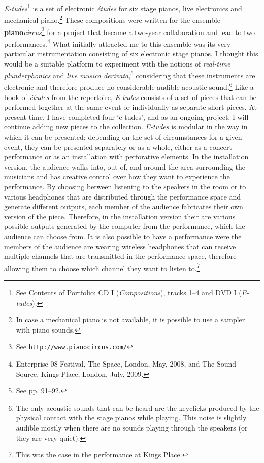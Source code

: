 \emph{E-tudes}\footnote{See \hyperlink{portfolio}{Contents of Portfolio}: CD I (\emph{Compositions}), tracks 1--4 and DVD I (\emph{E-tudes}).} is a set of electronic \emph{\'{e}tudes} for six stage pianos, live electronics and mechanical piano.\footnote{In case a mechanical piano is not available, it is possible to use a sampler with piano sounds.} These compositions were written for the ensemble \textbf{piano}\emph{circus}\footnote{See \href{http://www.pianocircus.com/}{\texttt{http://www.pianocircus.com/}}} for a project that became a \mbox{two-year} collaboration and lead to two performances.\footnote{Enterprise 08 Festival, The Space, London, May, 2008, and The Sound Source, Kings Place, London, July, 2009.} What initially attracted me to this ensemble was its very particular instrumentation consisting of six electronic stage pianos. I thought this would be a suitable platform to experiment with the notions of \emph{real-time plunderphonics} and \emph{live musica derivata},\footnote{See \hyperlink{realtimeplunderfuck}{pp. 91--92}.} considering that these instruments are electronic and therefore produce no considerable audible acoustic sound.\footnote{The only acoustic sounds that can be heard are the keyclicks produced by the physical contact with the stage pianos while playing. This noise is slightly audible mostly when there are no sounds playing through the speakers (or they are very quiet).} Like a book of \emph{\'{e}tudes} from the repertoire, \emph{E-tudes} consists of a set of pieces that can be performed together at the same event or individually as separate short pieces. At present time, I have completed four `e-tudes', and as an ongoing project, I will continue adding new pieces to the collection. \emph{E-tudes} is modular in the way in which it can be presented: depending on the set of circumstances for a given event, they can be presented separately or as a whole, either as a concert performance or as an installation with perforative elements. In the installation version, the audience walks into, out of, and around the area surrounding the musicians and has creative control over how they want to experience the performance. By choosing between listening to the speakers in the room or to various headphones that are distributed through the performance space and generate different outputs, each member of the audience fabricates their own version of the piece. Therefore, in the installation version their are various possible outputs generated by the computer from the performance, which the audience can choose from. It is also possible to have a performance were the members of the audience are wearing wireless headphones that can receive multiple channels that are transmitted in the performance space, therefore allowing them to choose which channel they want to listen to.\footnote{This was the case in the performance at Kings Place.}

